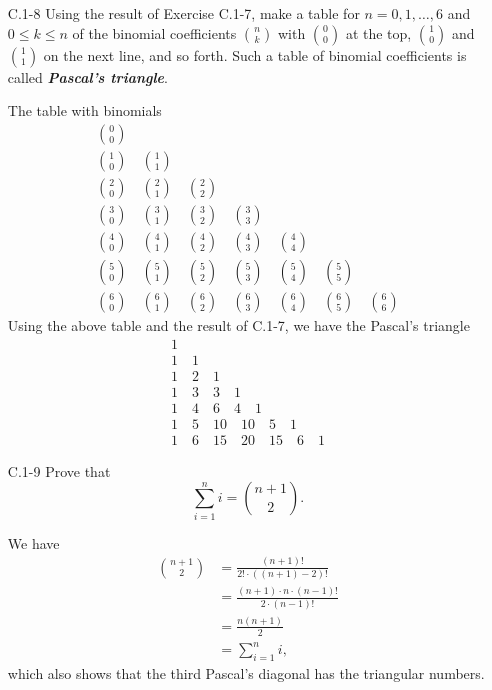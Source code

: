 \documentclass{report}
\makeatletter
\renewenvironment{framed}{%
 \def\FrameCommand##1{\hskip\@totalleftmargin
 \fboxsep=\FrameSep\fbox{##1}}%
 \MakeFramed {\advance\hsize-\width
   \@totalleftmargin\z@ \linewidth\hsize
   \@setminipage}}%
 {\par\unskip\endMakeFramed}
\makeatother
\begin{document}
\begin{enumerate}
\item[C.1{-}8] {Using the result of Exercise C.1-7, make a table for
$n = 0, 1, \dots, 6$ and $0 \le k \le n$ of the binomial coefficients
$\binom{n}{k}$ with $\binom{0}{0}$ at the top, $\binom{1}{0}$ and $\binom{1}{1}$
on the next line, and so forth. Such a table of binomial coefficients is called
\textbf{\emph{Pascal's triangle}}.}

\begin{framed}
The table with binomials
\begin{gather*}
  \binom{0}{0}\\
  \binom{1}{0} \quad \binom{1}{1}\\
  \binom{2}{0} \quad \binom{2}{1} \quad \binom{2}{2}\\
  \binom{3}{0} \quad \binom{3}{1} \quad \binom{3}{2} \quad \binom{3}{3}\\
  \binom{4}{0} \quad \binom{4}{1} \quad \binom{4}{2} \quad \binom{4}{3} \quad \binom{4}{4}\\
  \binom{5}{0} \quad \binom{5}{1} \quad \binom{5}{2} \quad \binom{5}{3} \quad \binom{5}{4} \quad \binom{5}{5}\\
  \binom{6}{0} \quad \binom{6}{1} \quad \binom{6}{2} \quad \binom{6}{3} \quad \binom{6}{4} \quad \binom{6}{5} \quad \binom{6}{6}
\end{gather*}
Using the above table and the result of C.1-7, we have the Pascal's triangle
\begin{gather*}
  1\\
  1 \quad 1\\
  1 \quad 2 \quad 1\\
  1 \quad 3 \quad 3 \quad 1\\
  1 \quad 4 \quad 6 \quad 4 \quad 1\\
  1 \quad 5 \quad 10 \quad 10 \quad 5 \quad 1\\
  1 \quad 6 \quad 15 \quad 20 \quad 15 \quad 6 \quad 1
\end{gather*}
\end{framed}

\item[C.1{-}9] {Prove that
\[
  \sum_{i = 1}^{n} i = \binom{n + 1}{2}.
\]
}

\begin{framed}
We have
\begin{equation*}
\begin{aligned}
  \binom{n + 1}{2} &= \frac{(n + 1)!}{2! \cdot ((n + 1) - 2)!}\\
                   &= \frac{(n + 1) \cdot n \cdot (n - 1)!}{2 \cdot (n - 1)!}\\
                   &= \frac{n (n + 1)}{2}\\
                   &= \sum_{i = 1}^{n} i,
\end{aligned}
\end{equation*}
which also shows that the third Pascal's diagonal has the triangular numbers.
\end{framed}


\end{enumerate}
\end{document}
